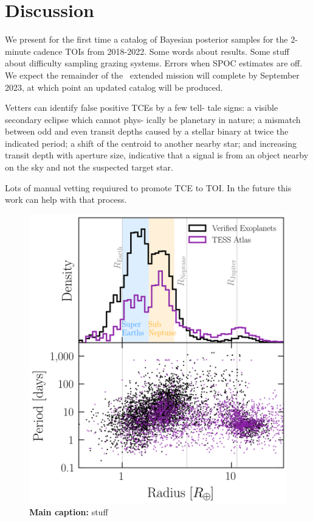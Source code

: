 \documentclass[floatfix,ApJL,twocolumn]{aastex631}
\begin{document}
\section{Discussion}\label{sec:conclusion}
We present for the first time a catalog of Bayesian posterior samples for the 2-minute cadence TOIs from 2018-2022.
Some words about results.
Some stuff about difficulty sampling grazing systems.
Errors when SPOC estimates are off.
We expect the remainder of the \tess\ extended mission will complete by September 2023, at which point an updated catalog will be produced.

Vetters can identify false positive TCEs by a few tell- tale signs: a visible secondary eclipse which cannot phys- ically be planetary in nature; a mismatch between odd and even transit depths caused by a stellar binary at twice the indicated period; a shift of the centroid to another nearby star; and increasing transit depth with aperture size, indicative that a signal is from an object nearby on the sky and not the suspected target star.

Lots of manual vetting requiured to promote TCE to TOI. In the future this work can help with that process.



\begin{figure}
  \includegraphics[width=\linewidth]{figures/radius_period_plot.png}
  \caption{\textbf{Main caption:} stuff }
  \label{fig:}
\end{figure}
\end{document}
